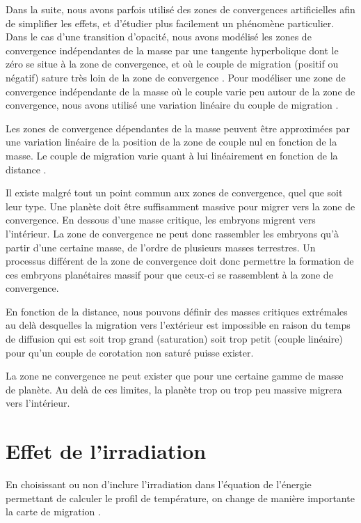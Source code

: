 Dans la suite, nous avons parfois utilisé des zones de convergences artificielles afin de simplifier les effets, et d'étudier
plus facilement un phénomène particulier. Dans le cas d'une transition d'opacité, nous avons modélisé les zones de convergence
indépendantes de la masse par une tangente hyperbolique dont le zéro se situe à la zone de convergence, et où le couple de
migration (positif ou négatif) sature très loin de la zone de convergence . Pour modéliser une zone de
convergence indépendante de la masse où le couple varie peu autour de la zone de convergence, nous avons utilisé une variation
linéaire du couple de migration .

Les zones de convergence dépendantes de la masse peuvent être approximées par une variation linéaire de la position de la zone
de couple nul en fonction de la masse. Le couple de migration varie quant à lui linéairement en fonction de la distance
. 

\bigskip

Il existe malgré tout un point commun aux zones de convergence, quel que soit leur type. Une planète doit être suffisamment massive pour migrer vers la zone de convergence. En dessous d'une masse critique, les embryons migrent vers l'intérieur. La zone de convergence ne peut donc rassembler les embryons qu'à partir d'une certaine masse, de l'ordre de plusieurs masses terrestres. Un processus différent de la zone de convergence doit donc permettre la formation de ces embryons planétaires massif pour que ceux-ci se rassemblent à la zone de convergence.

En fonction de la distance, nous pouvons définir des masses critiques extrémales au delà desquelles la migration vers
l'extérieur est impossible en raison du temps de diffusion qui est soit trop grand (saturation) soit trop petit (couple
linéaire) pour qu'un couple de corotation non saturé puisse exister.

La zone ne convergence ne peut exister que pour une certaine gamme de masse de planète. Au delà de ces limites, la planète trop ou trop peu massive migrera vers l'intérieur.

\section{Effet de l'irradiation}
En choisissant ou non d'inclure l'irradiation dans l'équation de l'énergie permettant de calculer le profil de température, on
change de manière importante la carte de migration \citep{bitsch2013stellar}. 

